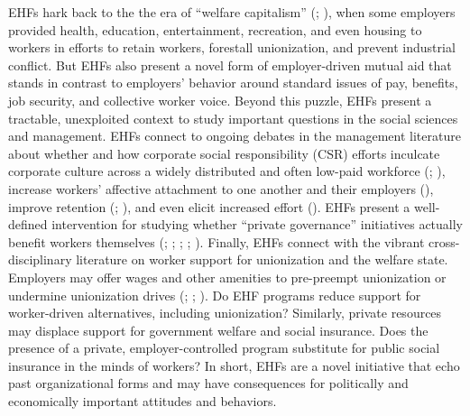 \documentclass[
  11pt,
  oneside]{article}
\begin{document}
EHFs hark back to the the era of ``welfare capitalism'' (; ), when some employers provided health, education, entertainment, recreation, and even housing to workers in efforts to retain workers, forestall unionization, and prevent industrial conflict. But EHFs also present a novel form of employer-driven mutual aid that stands in contrast to employers' behavior around standard issues of pay, benefits, job security, and collective worker voice. Beyond this puzzle, EHFs present a tractable, unexploited context to study important questions in the social sciences and management. EHFs connect to ongoing debates in the management literature about whether and how corporate social responsibility (CSR) efforts inculcate corporate culture across a widely distributed and often low-paid workforce (; ), increase workers' affective attachment to one another and their employers (), improve retention (; ), and even elicit increased effort (). EHFs present a well-defined intervention for studying whether ``private governance'' initiatives actually benefit workers themselves (; ; ; ; ). Finally, EHFs connect with the vibrant cross-disciplinary literature on worker support for unionization and the welfare state. Employers may offer wages and other amenities to pre-preempt unionization or undermine unionization drives (; ; ). Do EHF programs reduce support for worker-driven alternatives, including unionization? Similarly, private resources may displace support for government welfare and social insurance. Does the presence of a private, employer-controlled program substitute for public social insurance in the minds of workers? In short, EHFs are a novel initiative that echo past organizational forms and may have consequences for politically and economically important attitudes and behaviors.
\end{document}
